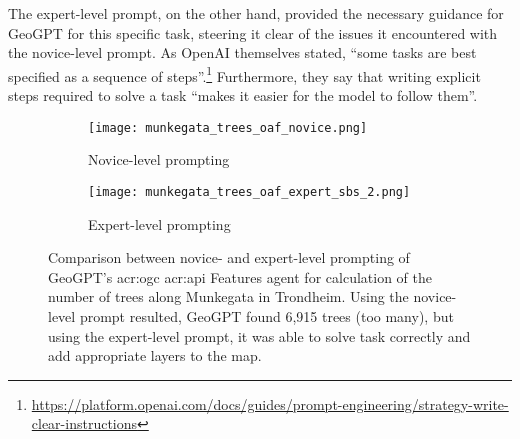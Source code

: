 The expert-level prompt, on the other hand, provided the necessary guidance for GeoGPT for this specific task, steering it clear of the issues it encountered with the novice-level prompt. As OpenAI themselves stated, \enquote{some tasks are best specified as a sequence of steps}.\footnote{\url{https://platform.openai.com/docs/guides/prompt-engineering/strategy-write-clear-instructions}} Furthermore, they say that writing explicit steps required to solve a task \enquote{makes it easier for the model to follow them}.

\begin{figure}[htbp]
    \centering
    \begin{subfigure}[b]{0.7\textwidth}
        \centering
        \texttt{[image: munkegata\_trees\_oaf\_novice.png]}
        \caption{Novice-level prompting}
        \label{fig:novice-level-prompting-munkegata-trees}
    \end{subfigure}
    \hfill
    \begin{subfigure}[b]{0.7\textwidth}
        \centering
        \texttt{[image: munkegata\_trees\_oaf\_expert\_sbs\_2.png]}
        \caption{Expert-level prompting}
        \label{fig:expert-level-prompting-munkegata-trees}
    \end{subfigure}
    \caption[Comparison between novice- and expert-level prompting of GeoGPT for calculating the number of trees along Munkegata in Trondheim.]{Comparison between novice- and expert-level prompting of GeoGPT's \acrshort{acr:ogc} \acrshort{acr:api} Features agent for calculation of the number of trees along Munkegata in Trondheim. Using the novice-level prompt resulted, GeoGPT found 6,915 trees (too many), but using the expert-level prompt, it was able to solve task correctly and add appropriate layers to the map.}
    \label{fig:novice-vs-expert-munkegata-trees}
\end{figure}


\glsresetall